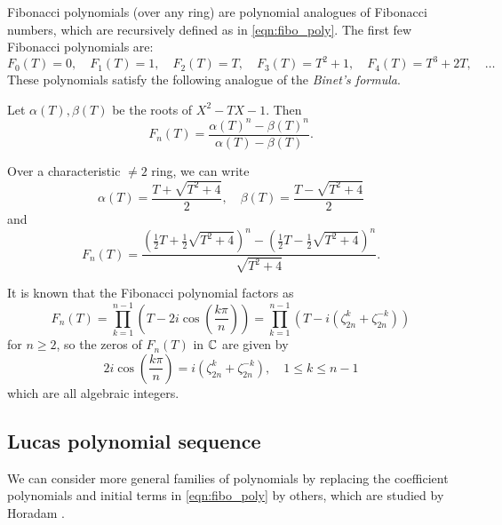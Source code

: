 Fibonacci polynomials (over any ring) are polynomial analogues of Fibonacci numbers, which are recursively defined as in \eqref{eqn:fibo_poly}.
The first few Fibonacci polynomials are:
\[
F_0(T) = 0, \quad F_1(T) = 1, \quad F_2(T) = T, \quad F_3(T) = T^2 + 1, \quad F_4(T) = T^3 + 2T, \quad\dots
\]
These polynomials satisfy the following analogue of the \emph{Binet's formula}.
\begin{proposition}
    Let $\alpha(T), \beta(T)$ be the roots of $X^2 - TX - 1$.
    Then
    \begin{equation}
    \label{eqn:FnBinet}
        F_n(T) = \frac{\alpha(T)^n - \beta(T)^n}{\alpha(T) - \beta(T)}.
    \end{equation}
\end{proposition}

Over a characteristic $\ne 2$ ring, we can write
    \[
        \alpha(T) = \frac{T + \sqrt{T^2 + 4}}{2}, \quad \beta(T) = \frac{T - \sqrt{T^2 + 4}}{2}
    \]
    and
    \begin{equation}
    \label{eqn:FnBinet2}
        F_{n}(T) = \frac{\left(\frac{1}{2}T + \frac{1}{2}\sqrt{T^2 + 4}\right)^{n} - \left(\frac{1}{2}T - \frac{1}{2}\sqrt{T^2 + 4}\right)^{n}}{\sqrt{T^2 + 4}} \text{.}
    \end{equation}

It is known that the Fibonacci polynomial factors as \cite[p. 478]{koshy}
\begin{equation}
    \label{eqn:fibo_factor}
    F_n(T) = \prod_{k=1}^{n-1} \left(T - 2 i \cos \left(\frac{k\pi}{n}\right)\right) = \prod_{k=1}^{n-1} (T - i (\zeta_{2n}^{k} + \zeta_{2n}^{-k}))
\end{equation}
for $n \ge 2$, so the zeros of $F_n(T)$ in $\mathbb{C}$ are given by
\begin{equation}
\label{eqn:fibo_zeros}
2i \cos \left(\frac{k\pi}{n}\right) = i(\zeta_{2n}^{k} + \zeta_{2n}^{-k}), \quad 1 \le k \le n - 1
\end{equation}
which are all algebraic integers.


\subsection{Lucas polynomial sequence} 
We can consider more general families of polynomials by replacing the coefficient polynomials and initial terms in \eqref{eqn:fibo_poly} by others, which are studied by Horadam \cite{Horadam1996}.

